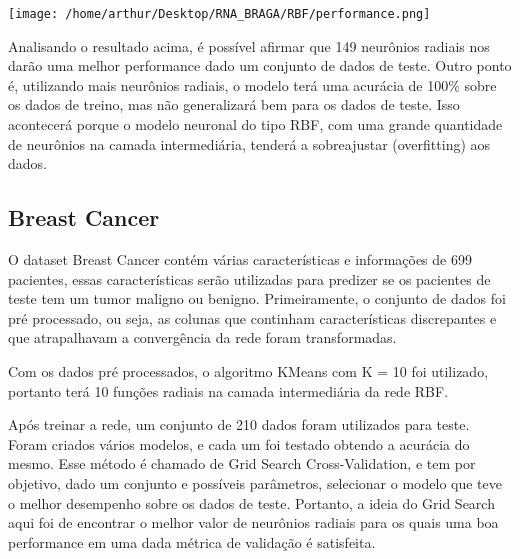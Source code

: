 \documentclass{article}
\begin{document}
\vspace{10pt}

\begin{center}

\texttt{[image: /home/arthur/Desktop/RNA\_BRAGA/RBF/performance.png]}
    
\end{center}

\vspace{10pt}

Analisando o resultado acima, é possível afirmar que 149 neurônios radiais nos darão uma melhor performance dado um conjunto de dados de teste. Outro ponto é, utilizando mais neurônios radiais, o modelo terá uma acurácia de 100\% sobre os dados de treino, mas não generalizará bem para os dados de teste. Isso acontecerá porque o modelo neuronal do tipo RBF, com uma grande quantidade de neurônios na camada intermediária, tenderá a sobreajustar (overfitting) aos dados.

\vspace{10pt}


\subsection{Breast Cancer}

O dataset Breast Cancer contém várias características e informações de 699 pacientes, essas características serão utilizadas para predizer se os pacientes de teste tem um tumor maligno ou benigno. Primeiramente, o conjunto de dados foi pré processado, ou seja, as colunas que continham características discrepantes e que atrapalhavam a convergência da rede foram transformadas.


\vspace{10pt}

Com os dados pré processados, o algoritmo KMeans com K = 10 foi utilizado, portanto terá 10 funções radiais na camada intermediária da rede RBF.

\vspace{10pt}

Após treinar a rede, um conjunto de 210 dados foram utilizados para teste. Foram criados vários modelos, e cada um foi testado obtendo a acurácia do mesmo. Esse método é chamado de Grid Search Cross-Validation, e tem por objetivo, dado um conjunto e possíveis parâmetros, selecionar o modelo que teve o melhor desempenho sobre os dados de teste. Portanto, a ideia do Grid Search aqui foi de encontrar o melhor valor de neurônios radiais para os quais uma boa performance em uma dada métrica de validação é satisfeita.
\end{document}
